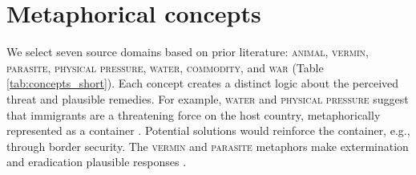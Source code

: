 

\section{Metaphorical concepts}
We select seven source domains based on prior literature: \textsc{animal, vermin, parasite, physical pressure, water, commodity,} and \textsc{war} (Table \ref{tab:concepts_short}). 
Each concept creates a distinct logic about the perceived threat and plausible remedies. For example, \textsc{water} and \textsc{physical pressure} suggest that immigrants are a threatening force on the host country, metaphorically represented as a container \citep{charteris-black_britain_2006}. Potential solutions would reinforce the container, e.g., through border security. 
The \textsc{vermin} and \textsc{parasite} metaphors 
make extermination and eradication plausible responses \citep{steuter_vermin_2010,musolff_metaphorical_2014,musolff_dehumanizing_2015}. %



